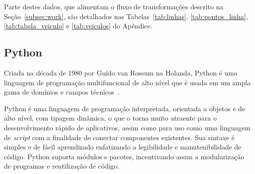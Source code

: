\textcolor{courb2020}{
Parte destes dados, que alimentam o fluxo de transformações descrito na Seção~\ref{subsec:work}, são detalhados nas Tabelas~\ref{tab:linhas}, \ref{tab:pontos_linha}, \ref{tab:tabela_veiculo} e \ref{tab:veiculos} do Apêndice.
}






\subsection{Python}


Criada na década de 1980 por Guido van Rossum na Holanda, Python é uma linguagem de programação multifuncional de alto nível que é usada em um ampla gama de domínios e campos técnicos~\cite{Yves:2018}.

Python é uma linguagem de programação interpretada, orientada a objetos e de alto nível, com tipagem dinâmica, o que o torna muito atraente para o desenvolvimento rápido de aplicativos, assim como para uso como uma linguagem de \emph{script} com a finalidade de conectar componentes existentes.
Sua sintaxe é simples e de fácil aprendizado enfatizando a legibilidade e manutenibilidade de código. Python suporta módulos e pacotes, incentivando assim a modularização de programas e reutilização de código.
 
